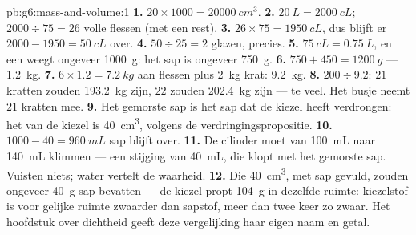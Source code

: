 \begin{solution}{pb:g6:mass-and-volume:1}
\textbf{1.} $20 \times 1000 = \qty{20000}{cm^3}$.
\textbf{2.} $\qty{20}{L} = \qty{2000}{cL}$; $2000 \div 75 = 26$ volle
flessen (met een rest).
\textbf{3.} $26 \times 75 = \qty{1950}{cL}$, dus blijft er
$2000 - 1950 = \qty{50}{cL}$ over.
\textbf{4.} $50 \div 25 = 2$ glazen, precies.
\textbf{5.} $\qty{75}{cL} = \qty{0.75}{L}$, en een  weegt
ongeveer \qty{1000}{g}: het sap is ongeveer \qty{750}{g}.
\textbf{6.} $750 + 450 = \qty{1200}{g}$ --- \qty{1.2}{kg}.
\textbf{7.} $6 \times 1.2 = \qty{7.2}{kg}$ aan flessen plus
\qty{2}{kg} krat: \qty{9.2}{kg}.
\textbf{8.} $200 \div 9.2$: $21$ kratten zouden \qty{193.2}{kg} zijn,
$22$ zouden \qty{202.4}{kg} zijn --- te veel. Het busje neemt $21$
kratten mee.
\textbf{9.} Het gemorste sap is het sap dat de kiezel heeft
verdrongen: het  van de kiezel is \qty{40}{cm^3}, volgens de
verdringingspropositie.
\textbf{10.} $1000 - 40 = \qty{960}{mL}$ sap blijft over.
\textbf{11.} De cilinder moet van \qty{100}{mL} naar \qty{140}{mL}
klimmen --- een stijging van \qty{40}{mL}, die klopt met het gemorste
sap. Vuisten  niets; water vertelt de waarheid.
\textbf{12.} Die \qty{40}{cm^3}, met sap gevuld, zouden ongeveer
\qty{40}{g} sap bevatten --- de kiezel propt \qty{104}{g} in dezelfde
ruimte: kiezelstof is voor gelijke ruimte zwaarder dan sapstof, meer
dan twee keer zo zwaar. Het hoofdstuk over dichtheid geeft deze
vergelijking haar eigen naam en getal.
\end{solution}
